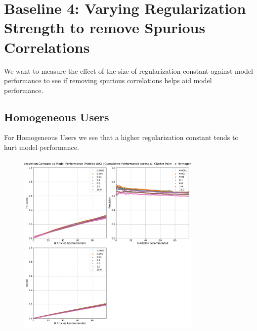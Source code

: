 \documentclass[a4paper,fontsize=9.0pt]{scrartcl}
\begin{document}
\section{Baseline 4: Varying Regularization Strength to remove Spurious Correlations}
\begin{flushleft}
We want to measure the effect of the size of regularization constant against model performance to see if removing spurious correlations helps aid model performance.

\subsection{Homogeneous Users}
\begin{flushleft}
For Homogeneous Users we see that a higher regularization constant tends to hurt model performance.
\end{flushleft}
\end{flushleft}
\begin{figure}[H]
 \includegraphics[width=0.8\textwidth]{Graphs/regularization_vs_model_performance_cumu_Homogeneous.pdf}
\end{figure}
\end{document}
